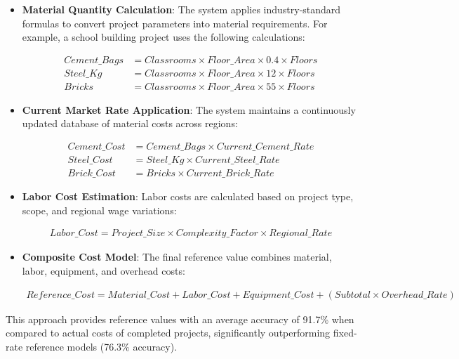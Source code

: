 \documentclass[12pt,a4paper]{report}
\begin{document}
\begin{itemize}
    \item \textbf{Material Quantity Calculation}: The system applies industry-standard formulas to convert project parameters into material requirements. For example, a school building project uses the following calculations:
    
    \begin{align}
        Cement\_Bags &= Classrooms \times Floor\_Area \times 0.4 \times Floors\\
        Steel\_Kg &= Classrooms \times Floor\_Area \times 12 \times Floors\\
        Bricks &= Classrooms \times Floor\_Area \times 55 \times Floors
    \end{align}
    
    \item \textbf{Current Market Rate Application}: The system maintains a continuously updated database of material costs across regions:
    
    \begin{align}
        Cement\_Cost &= Cement\_Bags \times Current\_Cement\_Rate\\
        Steel\_Cost &= Steel\_Kg \times Current\_Steel\_Rate\\
        Brick\_Cost &= Bricks \times Current\_Brick\_Rate
    \end{align}
    
    \item \textbf{Labor Cost Estimation}: Labor costs are calculated based on project type, scope, and regional wage variations:
    
    \begin{align}
        Labor\_Cost = Project\_Size \times Complexity\_Factor \times Regional\_Rate
    \end{align}
    
    \item \textbf{Composite Cost Model}: The final reference value combines material, labor, equipment, and overhead costs:
    
    \begin{align}
        Reference\_Cost = Material\_Cost + Labor\_Cost + Equipment\_Cost + (Subtotal \times Overhead\_Rate)
    \end{align}
\end{itemize}

\noindent This approach provides reference values with an average accuracy of 91.7\% when compared to actual costs of completed projects, significantly outperforming fixed-rate reference models (76.3\% accuracy).
\end{document}

